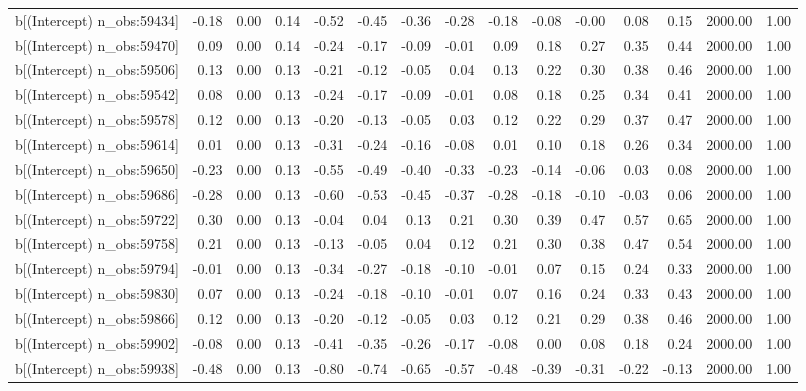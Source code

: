 \begin{table}[ht]
\begin{tabular}{rrrrrrrrrrrrrrr}
  b[(Intercept) n\_obs:59434] & -0.18 & 0.00 & 0.14 & -0.52 & -0.45 & -0.36 & -0.28 & -0.18 & -0.08 & -0.00 & 0.08 & 0.15 & 2000.00 & 1.00 \\ 
  b[(Intercept) n\_obs:59470] & 0.09 & 0.00 & 0.14 & -0.24 & -0.17 & -0.09 & -0.01 & 0.09 & 0.18 & 0.27 & 0.35 & 0.44 & 2000.00 & 1.00 \\ 
  b[(Intercept) n\_obs:59506] & 0.13 & 0.00 & 0.13 & -0.21 & -0.12 & -0.05 & 0.04 & 0.13 & 0.22 & 0.30 & 0.38 & 0.46 & 2000.00 & 1.00 \\ 
  b[(Intercept) n\_obs:59542] & 0.08 & 0.00 & 0.13 & -0.24 & -0.17 & -0.09 & -0.01 & 0.08 & 0.18 & 0.25 & 0.34 & 0.41 & 2000.00 & 1.00 \\ 
  b[(Intercept) n\_obs:59578] & 0.12 & 0.00 & 0.13 & -0.20 & -0.13 & -0.05 & 0.03 & 0.12 & 0.22 & 0.29 & 0.37 & 0.47 & 2000.00 & 1.00 \\ 
  b[(Intercept) n\_obs:59614] & 0.01 & 0.00 & 0.13 & -0.31 & -0.24 & -0.16 & -0.08 & 0.01 & 0.10 & 0.18 & 0.26 & 0.34 & 2000.00 & 1.00 \\ 
  b[(Intercept) n\_obs:59650] & -0.23 & 0.00 & 0.13 & -0.55 & -0.49 & -0.40 & -0.33 & -0.23 & -0.14 & -0.06 & 0.03 & 0.08 & 2000.00 & 1.00 \\ 
  b[(Intercept) n\_obs:59686] & -0.28 & 0.00 & 0.13 & -0.60 & -0.53 & -0.45 & -0.37 & -0.28 & -0.18 & -0.10 & -0.03 & 0.06 & 2000.00 & 1.00 \\ 
  b[(Intercept) n\_obs:59722] & 0.30 & 0.00 & 0.13 & -0.04 & 0.04 & 0.13 & 0.21 & 0.30 & 0.39 & 0.47 & 0.57 & 0.65 & 2000.00 & 1.00 \\ 
  b[(Intercept) n\_obs:59758] & 0.21 & 0.00 & 0.13 & -0.13 & -0.05 & 0.04 & 0.12 & 0.21 & 0.30 & 0.38 & 0.47 & 0.54 & 2000.00 & 1.00 \\ 
  b[(Intercept) n\_obs:59794] & -0.01 & 0.00 & 0.13 & -0.34 & -0.27 & -0.18 & -0.10 & -0.01 & 0.07 & 0.15 & 0.24 & 0.33 & 2000.00 & 1.00 \\ 
  b[(Intercept) n\_obs:59830] & 0.07 & 0.00 & 0.13 & -0.24 & -0.18 & -0.10 & -0.01 & 0.07 & 0.16 & 0.24 & 0.33 & 0.43 & 2000.00 & 1.00 \\ 
  b[(Intercept) n\_obs:59866] & 0.12 & 0.00 & 0.13 & -0.20 & -0.12 & -0.05 & 0.03 & 0.12 & 0.21 & 0.29 & 0.38 & 0.46 & 2000.00 & 1.00 \\ 
  b[(Intercept) n\_obs:59902] & -0.08 & 0.00 & 0.13 & -0.41 & -0.35 & -0.26 & -0.17 & -0.08 & 0.00 & 0.08 & 0.18 & 0.24 & 2000.00 & 1.00 \\ 
  b[(Intercept) n\_obs:59938] & -0.48 & 0.00 & 0.13 & -0.80 & -0.74 & -0.65 & -0.57 & -0.48 & -0.39 & -0.31 & -0.22 & -0.13 & 2000.00 & 1.00 \\ 

\end{tabular}
\end{table}
